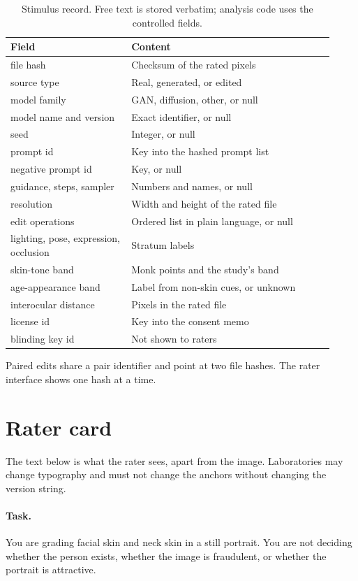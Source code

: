 \documentclass[10pt,twocolumn]{article}
\begin{document}
\begin{table}[t]
\centering
\caption{Stimulus record. Free text is stored verbatim; analysis code uses the controlled fields.}
\label{tab:meta}
\footnotesize
\begin{tabular}{@{}>{\raggedright\arraybackslash}p{0.34\linewidth}p{0.58\linewidth}@{}}
\toprule
Field & Content \\
\midrule
file hash & Checksum of the rated pixels \\
source type & Real, generated, or edited \\
model family & GAN, diffusion, other, or null \\
model name and version & Exact identifier, or null \\
seed & Integer, or null \\
prompt id & Key into the hashed prompt list \\
negative prompt id & Key, or null \\
guidance, steps, sampler & Numbers and names, or null \\
resolution & Width and height of the rated file \\
edit operations & Ordered list in plain language, or null \\
lighting, pose, expression, occlusion & Stratum labels \\
skin-tone band & Monk points and the study's band \\
age-appearance band & Label from non-skin cues, or unknown \\
interocular distance & Pixels in the rated file \\
license id & Key into the consent memo \\
blinding key id & Not shown to raters \\
\bottomrule
\end{tabular}
\end{table}

Paired edits share a pair identifier and point at two file hashes. The rater interface shows one hash at a time.

\section{Rater card}
\label{app:card}

The text below is what the rater sees, apart from the image. Laboratories may change typography and must not change the anchors without changing the version string.

\paragraph{Task.}
You are grading facial skin and neck skin in a still portrait. You are not deciding whether the person exists, whether the image is fraudulent, or whether the portrait is attractive.
\end{document}
